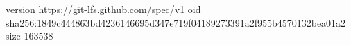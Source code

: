 version https://git-lfs.github.com/spec/v1
oid sha256:1849c444863bd4236146695d347e719f04189273391a2f955b4570132bea01a2
size 163538
